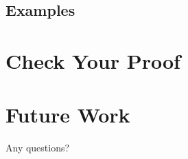 \documentclass{beamer}
\begin{document}
\subsection{Examples}

\section{Check Your Proof}

\section{Future Work}

\begin{frame}[standout]
\Large{\alert{Any questions?}}

\end{frame}

\end{document}
